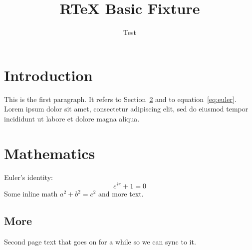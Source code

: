 \documentclass{article}
\title{RTeX Basic Fixture}
\author{Test}
\begin{document}
\maketitle
\tableofcontents

\section{Introduction}\label{sec:intro}
This is the first paragraph. It refers to Section~\ref{sec:math}
and to equation~\eqref{eq:euler}.
Lorem ipsum dolor sit amet, consectetur adipiscing elit, sed do eiusmod
tempor incididunt ut labore et dolore magna aliqua.

\section{Mathematics}\label{sec:math}
Euler's identity:
\begin{equation}\label{eq:euler}
  e^{i\pi} + 1 = 0
\end{equation}
Some inline math $a^2 + b^2 = c^2$ and more text.

\subsection{More}
\newpage
Second page text that goes on for a while so we can sync to it.

\printindex
\end{document}
